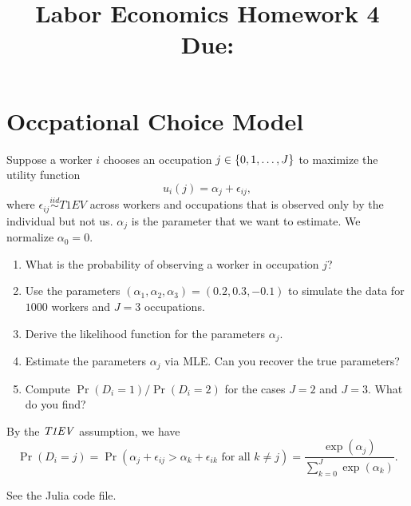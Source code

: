 \documentclass[12pt]{article}
\title{
    Labor Economics Homework 4 \\
    \large Due: \\
    }
\author{}
\date{}
\begin{document}
    

\maketitle
\vspace{-2cm}

\section{Occpational Choice Model}
Suppose a worker $i$ chooses an occupation $j\in\left\{ {0,1,\ldots,J} \right\}$ 
to maximize the utility function 
\begin{equation*}
    u_i(j) = \alpha_j + \epsilon_{ij},
\end{equation*}
where $\epsilon_{ij}\overset{iid}{\sim}T1EV$ across workers and occupations 
that is observed only by the individual but not us. $\alpha_j$ is the 
parameter that we want to estimate. We normalize $\alpha_0 = 0$.
\begin{enumerate}
    \item What is the probability of observing a worker in occupation $j$?
    \item Use the parameters $(\alpha_1, \alpha_2, \alpha_3) = (0.2, 0.3, -0.1)$ 
    to simulate the data for $1000$ workers and $J=3$ occupations.
    \item Derive the likelihood function for the parameters $\alpha_j$.
    \item Estimate the parameters $\alpha_j$ via MLE. Can you recover the true 
    parameters?
    \item Compute $\Pr(D_i = 1)/\Pr(D_i = 2)$ for the cases $J = 2$ and $J = 3$. 
    What do you find?
\end{enumerate}
\begin{sol}[1.1]
    By the $\it{T1EV}$ assumption, we have 
    \begin{equation*}
        \Pr(D_i = j) = \Pr(\alpha_j + \epsilon_{ij} > \alpha_k + \epsilon_{ik} \text{ for all } k\neq j) = \frac{\exp(\alpha_j)}{\sum_{k=0}^{J}\exp(\alpha_k)}.
    \end{equation*}
    \solend
\end{sol}
\begin{sol}[1.2, 1.4]
    See the Julia code file.
    \solend
\end{sol}
\end{document}
